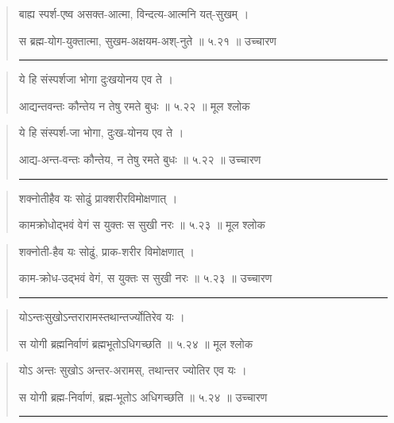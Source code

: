 \begin{quotation}

बाह्य स्पर्श-एष्व असक्त-आत्मा, विन्दत्य-आत्मनि यत्-सुखम्‌  ।  

स ब्रह्म-योग-युक्तात्मा, सुखम-अक्षयम-अश्-नुते  ॥ ५.२१ ॥  उच्चारण

\noindent\rule{16cm}{0.4pt} 
\end{quotation}


\begin{quotation}  

ये हि संस्पर्शजा भोगा दुःखयोनय एव ते  ।  

आद्यन्तवन्तः कौन्तेय न तेषु रमते बुधः  ॥ ५.२२ ॥  मूल श्लोक
\end{quotation}

\begin{quotation}

ये हि संस्पर्श-जा भोगा, दुःख-योनय एव ते  ।  

आद्य-अन्त-वन्तः कौन्तेय, न तेषु रमते बुधः  ॥ ५.२२ ॥  उच्चारण

\noindent\rule{16cm}{0.4pt} 
\end{quotation}


\begin{quotation}  

शक्नोतीहैव यः सोढुं प्राक्शरीरविमोक्षणात्‌  ।  

कामक्रोधोद्भवं वेगं स युक्तः स सुखी नरः  ॥ ५.२३ ॥  मूल श्लोक
\end{quotation}

\begin{quotation}
शक्नोती-हैव यः सोढुं, प्राक-शरीर विमोक्षणात्‌  ।  

काम-क्रोध-उद्भवं वेगं, स युक्तः स सुखी नरः  ॥ ५.२३ ॥  उच्चारण

\noindent\rule{16cm}{0.4pt} 
\end{quotation}


\begin{quotation}  

योऽन्तःसुखोऽन्तरारामस्तथान्तर्ज्योतिरेव यः  ।  

स योगी ब्रह्मनिर्वाणं ब्रह्मभूतोऽधिगच्छति  ॥ ५.२४ ॥  मूल श्लोक
\end{quotation}

\begin{quotation}

योऽ अन्तः सुखोऽ अन्तर-अरामस्, तथान्तर ज्योतिर एव यः  ।  

स योगी ब्रह्म-निर्वाणं, ब्रह्म-भूतोऽ अधिगच्छति  ॥ ५.२४ ॥  उच्चारण

\noindent\rule{16cm}{0.4pt} 
\end{quotation}


